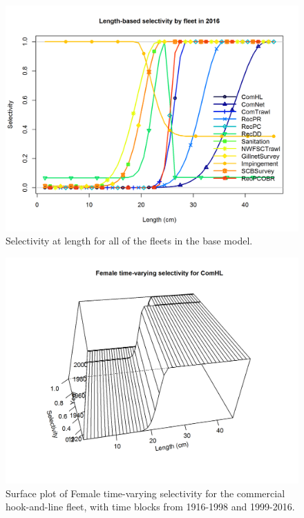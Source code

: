 \documentclass[12pt,]{article}
\begin{document}
\begin{figure}[htbp]
\centering
\includegraphics{r4ss/plots_mod1/sel01_multiple_fleets_length1.png}
\caption{Selectivity at length for all of the fleets in the base model.
\label{fig:sel01_multiple_fleets_length1}}
\end{figure}

\begin{figure}[htbp]
\centering
\includegraphics{r4ss/plots_mod1/sel03_len_timevary_surf_flt1sex1.png}
\caption{Surface plot of Female time-varying selectivity for the
commercial hook-and-line fleet, with time blocks from 1916-1998 and
1999-2016. \label{fig:sel03_len_timevary_surf_flt1sex1}}
\end{figure}
\end{document}
